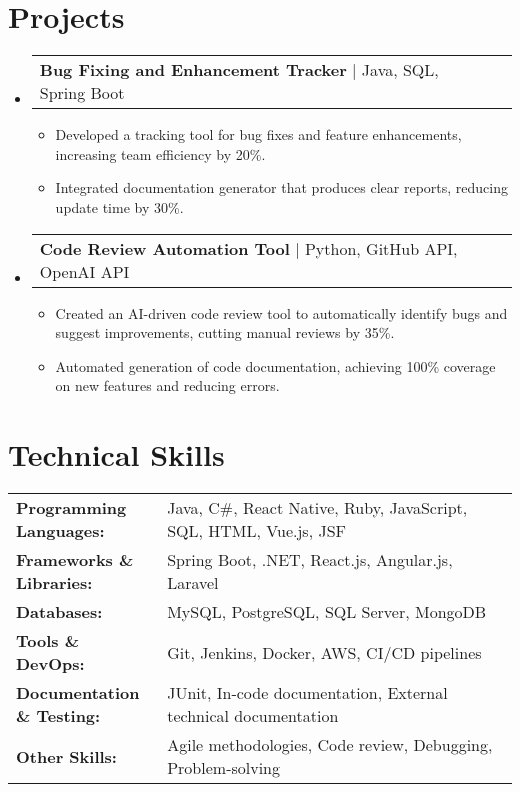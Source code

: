 \documentclass[letterpaper,11pt]{article}
\makeatletter
\newcommand{\resumeItem}[1]{
  \item\footnotesize{
    {#1 \vspace{-2pt}}
  }
}
\newcommand{\resumeProjectHeading}[2]{
    \item
    \begin{tabular*}{1.001\textwidth}{l@{\extracolsep{\fill}}r}
      \small#1 & \textbf{\small #2}\\
    \end{tabular*}\vspace{-7pt}
}
\newcommand{\resumeSubHeadingListStart}{\begin{itemize}[leftmargin=0pt, label={}]}
\newcommand{\resumeSubHeadingListEnd}{\end{itemize}}
\newcommand{\resumeItemListStart}{\begin{itemize}[leftmargin=*]}
\newcommand{\resumeItemListEnd}{\end{itemize}\vspace{-5pt}}
\makeatother
\begin{document}
\section{Projects}
    \vspace{-5pt}
    \resumeSubHeadingListStart
      \resumeProjectHeading
          {\textbf{Bug Fixing and Enhancement Tracker} | Java, SQL, Spring Boot}{}
          \resumeItemListStart
              \resumeItem{Developed a tracking tool for bug fixes and feature enhancements, increasing team efficiency by 20\%.}
              \resumeItem{Integrated documentation generator that produces clear reports, reducing update time by 30\%.}
          \resumeItemListEnd
          \vspace{-16pt}
      \resumeProjectHeading
          {\textbf{Code Review Automation Tool} | Python, GitHub API, OpenAI API}{}
          \resumeItemListStart
              \resumeItem{Created an AI-driven code review tool to automatically identify bugs and suggest improvements, cutting manual reviews by 35\%.}
              \resumeItem{Automated generation of code documentation, achieving 100\% coverage on new features and reducing errors.}
          \resumeItemListEnd
          \vspace{-16pt}
    \resumeSubHeadingListEnd
\vspace{-10pt}
\section{Technical Skills}
        \vspace{-14pt}
        \begin{table}[h]
            \footnotesize
            \begin{tabular}{p{0.3\linewidth} p{0.7\linewidth}}
                \textbf{Programming Languages:} & Java, C\#, React Native, Ruby, JavaScript, SQL, HTML, Vue.js, JSF \\
                \textbf{Frameworks \& Libraries:} & Spring Boot, .NET, React.js, Angular.js, Laravel \\
                \textbf{Databases:} & MySQL, PostgreSQL, SQL Server, MongoDB \\
                \textbf{Tools \& DevOps:} & Git, Jenkins, Docker, AWS, CI/CD pipelines \\
                \textbf{Documentation \& Testing:} & JUnit, In-code documentation, External technical documentation \\
                \textbf{Other Skills:} & Agile methodologies, Code review, Debugging, Problem-solving \\
            \end{tabular}
        \end{table}
\end{document}

